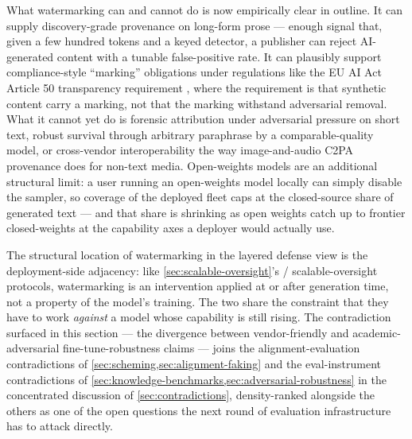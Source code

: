 What watermarking can and cannot do is now empirically clear in
outline. It can supply discovery-grade provenance on long-form
prose --- enough signal that, given a few hundred tokens and a keyed
detector, a publisher can reject AI-generated content with a tunable
false-positive rate. It can plausibly support compliance-style
``marking'' obligations under regulations like the EU AI Act
Article 50 transparency requirement
, where the requirement
is that synthetic content carry a marking, not that the marking
withstand adversarial removal. What it cannot yet do is forensic
attribution under adversarial pressure on short text, robust survival
through arbitrary paraphrase by a comparable-quality model, or
cross-vendor interoperability the way image-and-audio C2PA
provenance does for non-text media. Open-weights models are an
additional structural limit: a user running an open-weights model
locally can simply disable the  sampler, so coverage of the
deployed  fleet caps at the closed-source share of generated
text 
--- and that share is shrinking as open weights catch up to frontier
closed-weights at the capability axes a deployer would actually use.

The structural location of watermarking in the layered defense view
is the deployment-side adjacency: like \cref{sec:scalable-oversight}'s
 / scalable-oversight protocols, watermarking is an intervention
applied at or after generation time, not a property of the model's
training. The two share the constraint that they have to work
\emph{against} a model whose capability is still rising. The
contradiction surfaced in this section --- the divergence between
vendor-friendly and academic-adversarial fine-tune-robustness claims
--- joins the alignment-evaluation contradictions of
\cref{sec:scheming,sec:alignment-faking} and the eval-instrument
contradictions of \cref{sec:knowledge-benchmarks,sec:adversarial-robustness}
in the concentrated discussion of \cref{sec:contradictions},
density-ranked alongside the others as one of the open questions
the next round of evaluation infrastructure has to attack directly.
